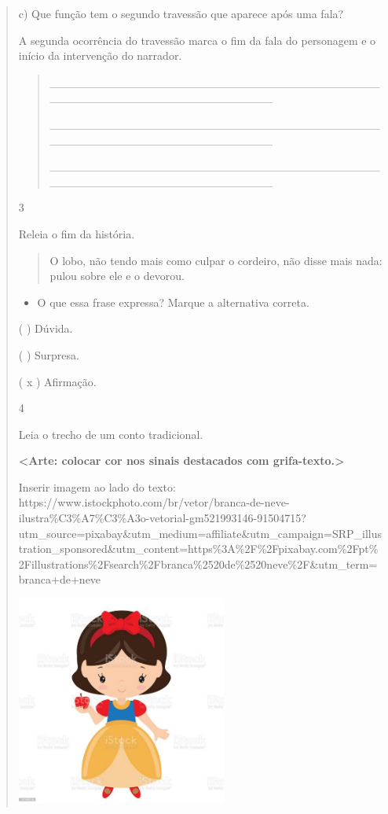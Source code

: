 \begin{boxlist}
\begin{quote}
\begin{iteize}
{c) Que função tem o segundo travessão que aparece após uma fala?

A segunda ocorrência do travessão marca o fim da fala do personagem e o
início da intervenção do narrador.

\begin{quote}
\_\_\_\_\_\_\_\_\_\_\_\_\_\_\_\_\_\_\_\_\_\_\_\_\_\_\_\_\_\_\_\_\_\_\_\_\_\_\_\_\_\_\_\_\_\_\_\_\_\_\_\_\_\_\_\_\_\_\_\_\_\_\_\_\_\_\_

\_\_\_\_\_\_\_\_\_\_\_\_\_\_\_\_\_\_\_\_\_\_\_\_\_\_\_\_\_\_\_\_\_\_\_\_\_\_\_\_\_\_\_\_\_\_\_\_\_\_\_\_\_\_\_\_\_\_\_\_\_\_\_\_\_\_\_

\_\_\_\_\_\_\_\_\_\_\_\_\_\_\_\_\_\_\_\_\_\_\_\_\_\_\_\_\_\_\_\_\_\_\_\_\_\_\_\_\_\_\_\_\_\_\_\_\_\_\_\_\_\_\_\_\_\_\_\_\_\_\_\_\_\_\_
\end{quote}

\num{3}

Releia o fim da história.

\begin{quote}
O lobo, não tendo mais como culpar o cordeiro, não disse mais nada:
pulou sobre ele e o devorou.
\end{quote}

\begin{itemize}
\item
  O que essa frase expressa? Marque a alternativa correta.
\end{itemize}

( ) Dúvida.

( ) Surpresa.

( x ) Afirmação.

\num{4}

Leia o trecho de um conto tradicional.

\textbf{\textless{}Arte: colocar cor nos sinais destacados com
grifa-texto.\textgreater{}}

Inserir imagem ao lado do texto:
https://www.istockphoto.com/br/vetor/branca-de-neve-ilustra\%C3\%A7\%C3\%A3o-vetorial-gm521993146-91504715?utm\_source=pixabay\&utm\_medium=affiliate\&utm\_campaign=SRP\_illustration\_sponsored\&utm\_content=https\%3A\%2F\%2Fpixabay.com\%2Fpt\%2Fillustrations\%2Fsearch\%2Fbranca\%2520de\%2520neve\%2F\&utm\_term=branca+de+neve

\includegraphics[width=2.71875in,height=2.71875in]{media/image6.jpeg}

}
\end{iteize}
\end{quote}
\end{boxlist}
